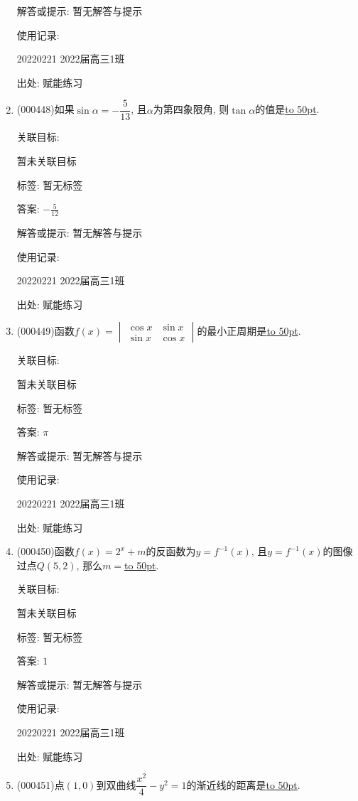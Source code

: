 \documentclass[10pt,a4paper]{article}
\newcommand{\blank}[1]{\underline{\hbox to #1pt{}}}
\begin{document}
\begin{enumerate}[1.]
解答或提示: 暂无解答与提示

使用记录:

20220221	2022届高三1班	


出处: 赋能练习
\item { (000448)}如果$\sin \alpha =-\dfrac5{13}$, 且$\alpha$为第四象限角, 则$\tan \alpha$的值是\blank{50}.


关联目标:

暂未关联目标



标签: 暂无标签

答案: $-\frac 5{12}$

解答或提示: 暂无解答与提示

使用记录:

20220221	2022届高三1班	


出处: 赋能练习
\item { (000449)}函数$f(x)=\begin{vmatrix}   \cos x & \sin x  \\    \sin x & \cos x \end{vmatrix}$的最小正周期是\blank{50}.


关联目标:

暂未关联目标



标签: 暂无标签

答案: $\pi$

解答或提示: 暂无解答与提示

使用记录:

20220221	2022届高三1班	


出处: 赋能练习
\item { (000450)}函数$f(x)=2^x+m$的反函数为$y=f^{-1}(x)$, 且$y=f^{-1}(x)$的图像过点$Q(5,2)$, 那么$m=$\blank{50}.


关联目标:

暂未关联目标



标签: 暂无标签

答案: $1$

解答或提示: 暂无解答与提示

使用记录:

20220221	2022届高三1班	


出处: 赋能练习
\item { (000451)}点$(1,0)$到双曲线$\dfrac{x^2}4-y^2=1$的渐近线的距离是\blank{50}.



\end{enumerate}
\end{document}
